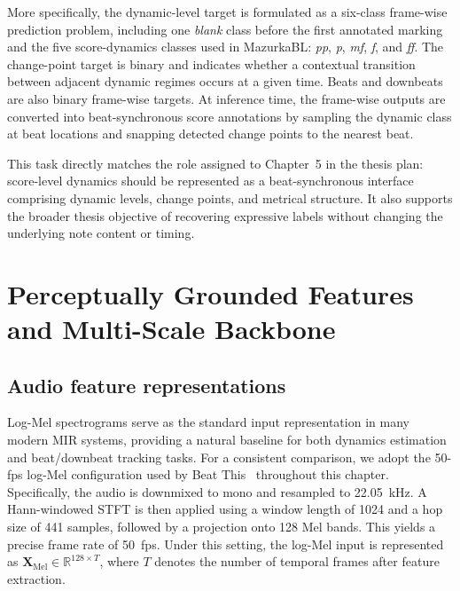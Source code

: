 More specifically, the dynamic-level target is formulated as a six-class frame-wise prediction problem, including one \textit{blank} class before the first annotated marking and the five score-dynamics classes used in MazurkaBL: \textit{pp}, \textit{p}, \textit{mf}, \textit{f}, and \textit{ff}. The change-point target is binary and indicates whether a contextual transition between adjacent dynamic regimes occurs at a given time. Beats and downbeats are also binary frame-wise targets. At inference time, the frame-wise outputs are converted into beat-synchronous score annotations by sampling the dynamic class at beat locations and snapping detected change points to the nearest beat.

This task directly matches the role assigned to Chapter~5 in the thesis plan: score-level dynamics should be represented as a beat-synchronous interface comprising dynamic levels, change points, and metrical structure. It also supports the broader thesis objective of recovering expressive labels without changing the underlying note content or timing.

\section{Perceptually Grounded Features and Multi-Scale Backbone}
\label{sec:audiodyn_features}

\subsection{Audio feature representations}
\label{ssec:audiodyn_features}

Log-Mel spectrograms serve as the standard input representation in many modern MIR systems, providing a natural baseline for both dynamics estimation and beat/downbeat tracking tasks. For a consistent comparison, we adopt the 50-fps log-Mel configuration used by Beat This~\cite{foscarin2024beat} throughout this chapter. Specifically, the audio is downmixed to mono and resampled to 22.05~kHz. A Hann-windowed STFT is then applied using a window length of 1024 and a hop size of 441 samples, followed by a projection onto 128 Mel bands. This yields a precise frame rate of 50~fps. Under this setting, the log-Mel input is represented as $\mathbf{X}_{\mathrm{Mel}} \in \mathbb{R}^{128 \times T}$, where $T$ denotes the number of temporal frames after feature extraction.


